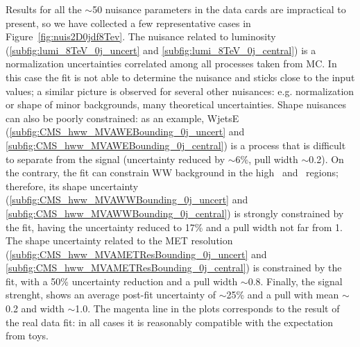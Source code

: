 Results for all the $\sim$50 nuisance parameters in the data cards are impractical to present, 
so we have collected a few representative cases in Figure~\ref{fig:nuis2D0jdf8Tev}.
The nuisance related to luminosity (\ref{subfig:lumi_8TeV_0j_uncert} and \ref{subfig:lumi_8TeV_0j_central}) is a normalization uncertainties correlated 
among all processes taken from MC. 
In this case the fit is not able to determine the nuisance and sticks close to the input values; a similar picture is observed for several other nuisances: 
e.g. normalization or shape of minor backgrounds, many theoretical uncertainties.
Shape nuisances can also be poorly constrained: as an example, WjetsE (\ref{subfig:CMS_hww_MVAWEBounding_0j_uncert} and \ref{subfig:CMS_hww_MVAWEBounding_0j_central}) 
is a process that is difficult to separate from the signal (uncertainty reduced by $\sim$6\%, pull width $\sim$0.2).
On the contrary, the fit can constrain WW background in the high \mt\ and \mll\ regions; therefore, its shape uncertainty 
(\ref{subfig:CMS_hww_MVAWWBounding_0j_uncert} and \ref{subfig:CMS_hww_MVAWWBounding_0j_central}) is strongly constrained by the fit, 
having the uncertainty reduced to 17\% and a pull width not far from 1.
The shape uncertainty related to the MET resolution (\ref{subfig:CMS_hww_MVAMETResBounding_0j_uncert} and \ref{subfig:CMS_hww_MVAMETResBounding_0j_central}) is constrained
by the fit, with a 50\% uncertainty reduction and a pull width $\sim$0.8.
Finally, the signal strenght, shows an average post-fit uncertainty of $\sim$25\% and a pull with mean $\sim$0.2 and width $\sim$1.0.
The magenta line in the plots corresponds to the result of the real data fit: in all cases it is reasonably compatible with the expectation from toys.

